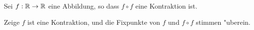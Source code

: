 \documentclass[a4paper,10pt]{article}
\begin{document}
% 
% 
% 
% 
% 


\begin{Aufg}
 Sei $f: \mathbb{R} \to \mathbb{R}$ eine Abbildung, so dass $f\circ f$ eine Kontraktion ist. 
 
 Zeige $f$ ist eine Kontraktion, und die Fixpunkte von $f$ und $f \circ f$ stimmen 
 "uberein.
 
\end{Aufg}
\end{document}

